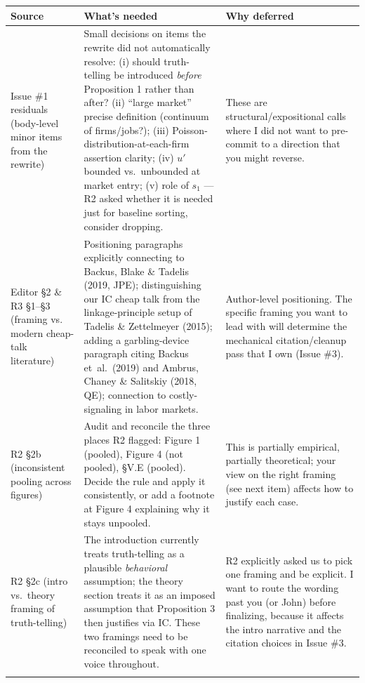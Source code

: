 \documentclass[11pt]{article}
\begin{document}
\begin{longtable}{L{3.2cm} L{7.5cm} L{4.5cm}}
\toprule
\textbf{Source} & \textbf{What's needed} & \textbf{Why deferred} \\
\midrule
\endhead

Issue \#1 residuals (body-level minor items from the rewrite) & Small decisions on items the rewrite did not automatically resolve: (i) should truth-telling be introduced \emph{before} Proposition 1 rather than after? (ii) ``large market'' precise definition (continuum of firms/jobs?); (iii) Poisson-distribution-at-each-firm assertion clarity; (iv) $u'$ bounded vs.~unbounded at market entry; (v) role of $s_1$ --- R2 asked whether it is needed just for baseline sorting, consider dropping. & These are structural/expositional calls where I did not want to pre-commit to a direction that you might reverse. \\
\addlinespace

Editor \S2 \& R3 \S1--\S3 (framing vs. modern cheap-talk literature) & Positioning paragraphs explicitly connecting to Backus, Blake \& Tadelis (2019, JPE); distinguishing our IC cheap talk from the linkage-principle setup of Tadelis \& Zettelmeyer (2015); adding a garbling-device paragraph citing Backus et~al.~(2019) and Ambrus, Chaney \& Salitskiy (2018, QE); connection to costly-signaling in labor markets. & Author-level positioning. The specific framing you want to lead with will determine the mechanical citation/cleanup pass that I own (Issue \#3). \\
\addlinespace

R2 \S2b (inconsistent pooling across figures) & Audit and reconcile the three places R2 flagged: Figure 1 (pooled), Figure 4 (not pooled), \S V.E (pooled). Decide the rule and apply it consistently, or add a footnote at Figure 4 explaining why it stays unpooled. & This is partially empirical, partially theoretical; your view on the right framing (see next item) affects how to justify each case. \\
\addlinespace

R2 \S2c (intro vs.~theory framing of truth-telling) & The introduction currently treats truth-telling as a plausible \emph{behavioral} assumption; the theory section treats it as an imposed assumption that Proposition 3 then justifies via IC. These two framings need to be reconciled to speak with one voice throughout. & R2 explicitly asked us to pick one framing and be explicit. I want to route the wording past you (or John) before finalizing, because it affects the intro narrative and the citation choices in Issue \#3. \\
\addlinespace


\end{longtable}
\end{document}
